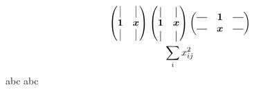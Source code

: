 \documentclass{article}
\newcommand*{\vertbar}{\rule[-1ex]{0.5pt}{2.5ex}}
\newcommand*{\horzbar}{\rule[.5ex]{2.5ex}{0.5pt}}
\newcommand{\ve}[1]{\boldsymbol{#1}}
\begin{document}
\begin{gather*}
    \begin{pmatrix}
        \vrule & \vrule\\
        \ve{1} & \ve{x}\\
        \vrule & \vrule
    \end{pmatrix}
    \begin{pmatrix}
        \vertbar & \vertbar\\
        \ve{1} & \ve{x}\\
        \vertbar & \vertbar
    \end{pmatrix}
    \begin{pmatrix}
        \horzbar & \ve{1} & \horzbar\\
        \horzbar & \ve{x} & \horzbar
    \end{pmatrix}\\
    \sum_i x_{ij}^2
\end{gather*}
abc \textlatin{abc}
\end{document}
